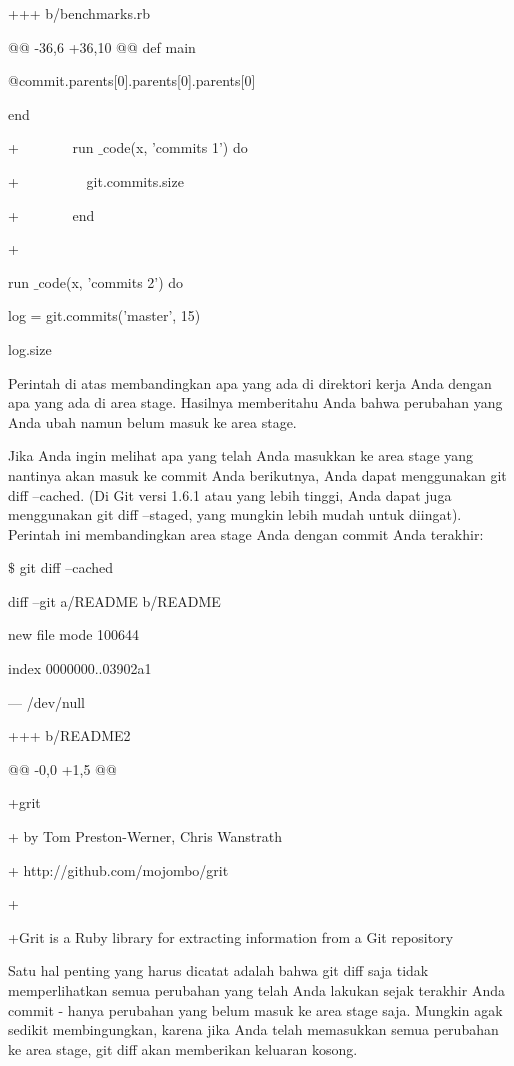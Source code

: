 \noindent 
+++ b/benchmarks.rb \par
\noindent 
@@ -36,6 +36,10 @@ def main \par
\noindent 
@commit.parents[0].parents[0].parents[0] \par
\noindent 
end \par
\vspace{12pt}
\noindent 
+~~~~~~~ run $  \_  $code(x, 'commits 1') do \par
\noindent 
+~~~~~~~~~ git.commits.size \par
\noindent 
+~~~~~~~ end \par
\noindent 
+ \par
\noindent 
run $  \_  $code(x, 'commits 2') do \par
\noindent 
log = git.commits('master', 15) \par
\noindent 
log.size \par
\noindent 
Perintah di atas membandingkan apa yang ada di direktori kerja Anda dengan apa yang ada di area stage. Hasilnya memberitahu Anda bahwa perubahan yang Anda ubah namun belum masuk ke area stage. \par
\noindent 
Jika Anda ingin melihat apa yang telah Anda masukkan ke area stage yang nantinya akan masuk ke commit Anda berikutnya, Anda dapat menggunakan $  $git diff --cached. (Di Git versi 1.6.1 atau yang lebih tinggi, Anda dapat juga menggunakan $  $git diff --staged, yang mungkin lebih mudah untuk diingat). Perintah ini membandingkan area stage Anda dengan commit Anda terakhir: \par
\noindent 
 $  \$  $ git diff --cached \par
\noindent 
diff --git a/README b/README \par
\noindent 
new file mode 100644 \par
\noindent 
index 0000000..03902a1 \par
\noindent 
--- /dev/null \par
\noindent 
+++ b/README2 \par
\noindent 
@@ -0,0 +1,5 @@ \par
\noindent 
+grit \par
\noindent 
+ by Tom Preston-Werner, Chris Wanstrath \par
\noindent 
+ http://github.com/mojombo/grit \par
\noindent 
+ \par
\noindent 
+Grit is a Ruby library for extracting information from a Git repository \par
\noindent 
Satu hal penting yang harus dicatat adalah bahwa $  $git diff $  $saja tidak memperlihatkan semua perubahan yang telah Anda lakukan sejak terakhir Anda commit - hanya perubahan yang belum masuk ke area stage saja. Mungkin agak sedikit membingungkan, karena jika Anda telah memasukkan semua perubahan ke area stage, $  $git diff $  $akan memberikan keluaran kosong. \par
